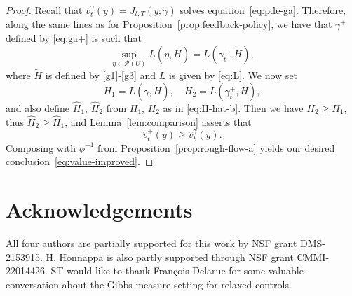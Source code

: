 \documentclass[12pt,reqno]{amsart}
\numberwithin{equation}{section}  %
\newcommand{\1}{{\bf 1}}
\newcommand{\2}{{\bf 2}}
\newcommand{\cp}{\mathcal P}
\newcommand{\ga}{\gamma}
\theoremstyle{remark}
\theoremstyle{remark}
\begin{document}
\begin{proof}
Recall that $v_t^{\ga}(y) = J_{t,T}(y;\ga)$ solves equation~\eqref{eq:pde-ga}. Therefore, along the same lines as for Proposition~\ref{prop:feedback-policy}, we have that $\ga^{+}$ defined by \eqref{eq:ga+} is such that 
$$
\sup_{\eta \in \cp(U)} L(\eta, \tilde{H}) = L(\ga_t^{+}, \tilde{H}),
$$
where $\tilde{H}$ is defined by \eqref{g1}-\eqref{g3} and $L$ is given by \eqref{eq:L}. We now set
$$
H_{1}=L(\ga, \tilde{H}), \quad H_{2}=L(\ga_t^{+}, \tilde{H}),
$$
and also define $\hat{H}_1$, $\hat{H}_2$ from $H_1$, $H_2$ as in \eqref{eq:H-hat-b}. Then we have $H_2 \geq H_1$, thus $\hat{H}_2 \geq \hat{H}_1$, and Lemma~\ref{lem:comparison} asserts that
$$
\hat{v}_t^{+}(y) \geq \hat{v}_t^{\ga}(y).
$$
Composing with $\phi^{-1}$ from Proposition~\ref{prop:rough-flow-a} yields our desired conclusion~\eqref{eq:value-improved}.
\end{proof}



\section*{Acknowledgements}
\noindent
All four authors are partially supported for this work by NSF grant  DMS-2153915. H. Honnappa is also partly supported through NSF grant CMMI-22014426. ST would like to thank François Delarue for some valuable conversation about the Gibbs measure setting for relaxed controls.




%


\end{document}

